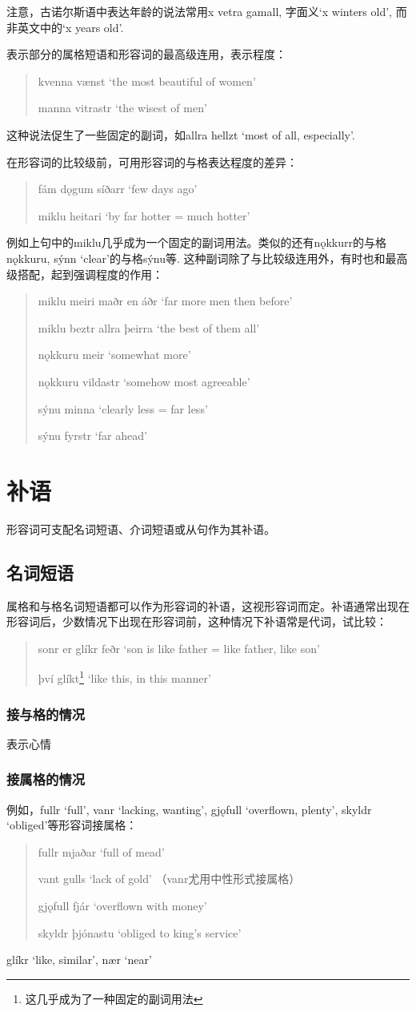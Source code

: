 注意，古诺尔斯语中表达年龄的说法常用x vetra gamall, 字面义`x winters old', 而非英文中的`x years old'.

表示部分的属格短语和形容词的最高级连用，表示程度：
\begin{quote}
    kvenna vænst `the most beautiful of women'

    manna vitrastr `the wisest of men'
\end{quote}
这种说法促生了一些固定的副词，如allra hellzt `most of all, especially'.

在形容词的比较级前，可用形容词的与格表达程度的差异：
\begin{quote}
    fám dǫgum síðarr `few days ago'

    miklu heitari `by far hotter = much hotter'
\end{quote}
例如上句中的miklu几乎成为一个固定的副词用法。类似的还有nǫkkurr的与格nǫkkuru, sýnn `clear'的与格sýnu等. 这种副词除了与比较级连用外，有时也和最高级搭配，起到强调程度的作用：
\begin{quote}
    miklu meiri maðr en áðr `far more men then before'

    miklu beztr allra þeirra `the best of them all'

    nǫkkuru meir `somewhat more'

    nǫkkuru vildastr `somehow most agreeable'

    sýnu minna `clearly less = far less'

    sýnu fyrstr `far ahead'
\end{quote}

\section{补语}
形容词可支配名词短语、介词短语或从句作为其补语。
\subsection{名词短语}
属格和与格名词短语都可以作为形容词的补语，这视形容词而定。补语通常出现在形容词后，少数情况下出现在形容词前，这种情况下补语常是代词，试比较：
\begin{quote}
    sonr er glíkr feðr `son is like father = like father, like son'

    því glíkt\footnote{这几乎成为了一种固定的副词用法} `like this, in this manner'
\end{quote}
\subsubsection*{接与格的情况}
表示心情
\subsubsection*{接属格的情况}
例如，fullr `full', vanr `lacking, wanting', gjǫfull `overflown, plenty', skyldr `obliged'等形容词接属格：
\begin{quote}
    fullr mjaðar `full of mead'

    vant gulls `lack of gold' （vanr尤用中性形式接属格）

    gjǫfull fjár `overflown with money'

    skyldr þjónastu `obliged to king's service'
\end{quote}
glíkr `like, similar', nær `near'
